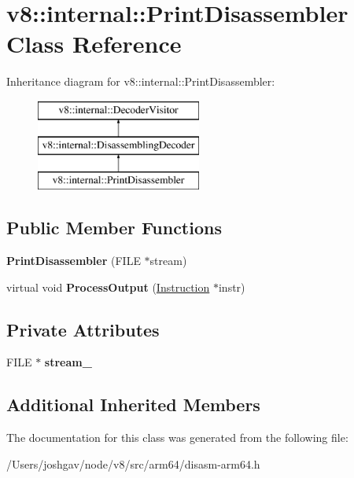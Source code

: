 \hypertarget{classv8_1_1internal_1_1_print_disassembler}{}\section{v8\+:\+:internal\+:\+:Print\+Disassembler Class Reference}
\label{classv8_1_1internal_1_1_print_disassembler}
Inheritance diagram for v8\+:\+:internal\+:\+:Print\+Disassembler\+:\begin{figure}[H]
\begin{center}
\leavevmode
\includegraphics[height=3.000000cm]{classv8_1_1internal_1_1_print_disassembler}
\end{center}
\end{figure}
\subsection*{Public Member Functions}
\begin{DoxyCompactItemize}
\item 
{\bfseries Print\+Disassembler} (F\+I\+LE $\ast$stream)\hypertarget{classv8_1_1internal_1_1_print_disassembler_ab5104bb021b6be0bff543d3210c234ed}{}\label{classv8_1_1internal_1_1_print_disassembler_ab5104bb021b6be0bff543d3210c234ed}

\item 
virtual void {\bfseries Process\+Output} (\hyperlink{classv8_1_1internal_1_1_instruction}{Instruction} $\ast$instr)\hypertarget{classv8_1_1internal_1_1_print_disassembler_a033c57b8b49dd172975c7d0946d039d5}{}\label{classv8_1_1internal_1_1_print_disassembler_a033c57b8b49dd172975c7d0946d039d5}

\end{DoxyCompactItemize}
\subsection*{Private Attributes}
\begin{DoxyCompactItemize}
\item 
F\+I\+LE $\ast$ {\bfseries stream\+\_\+}\hypertarget{classv8_1_1internal_1_1_print_disassembler_a5d5fb43709be6a737a6f9444fc242b4b}{}\label{classv8_1_1internal_1_1_print_disassembler_a5d5fb43709be6a737a6f9444fc242b4b}

\end{DoxyCompactItemize}
\subsection*{Additional Inherited Members}


The documentation for this class was generated from the following file\+:\begin{DoxyCompactItemize}
\item 
/\+Users/joshgav/node/v8/src/arm64/disasm-\/arm64.\+h\end{DoxyCompactItemize}
